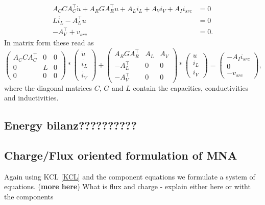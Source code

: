 \documentclass[11pt,titlepage]{article}
\begin{document}
			\begin{displaymath}
				\begin{aligned}
					A_C C A_C^\top \dot{u} + A_R G A_R^\top u + A_L i_L + A_V i_V + A_I i_{src} &= 0 \\
					L \dot{i_L}	- A_L^\top u &= 0 \\
					-A_V^\top + v_{src} &= 0.
				\end{aligned}	
			\end{displaymath}
			In matrix form these read as
			\begin{displaymath}
				\begin{pmatrix}
					A_C C A_C^\top & 0 & 0 \\
					0 & L & 0 \\
					0 & 0 & 0
				\end{pmatrix}
				*
				\begin{pmatrix}
					\dot{u} \\
					\dot{i_L} \\
					\dot{i_V}
				\end{pmatrix}
				+
				\begin{pmatrix}
					A_R G A_R^\top & A_L & A_V \\
					-A_L^\top & 0 & 0 \\
					-A_V^\top & 0 & 0 
				\end{pmatrix}
				*
				\begin{pmatrix}
					u \\
					i_L \\
					i_V
				\end{pmatrix}
				=
				\begin{pmatrix}
					-A_I i_{src} \\
					0 \\
					-v_{src}
				\end{pmatrix} , 
			\end{displaymath}
			where the diagonal matrices $C$, $G$ and $L$ contain the capacities, conductivities and inductivities.
		
		\subsection{Energy \textbf{bilanz??????????}}
		
		\subsection{Charge/Flux oriented formulation of MNA}
			Again using KCL \ref{KCL} and the component equations we formulate a system of equations. (\textbf{more here}) What is flux and charge - explain either here or witht the components
			
\end{document}
